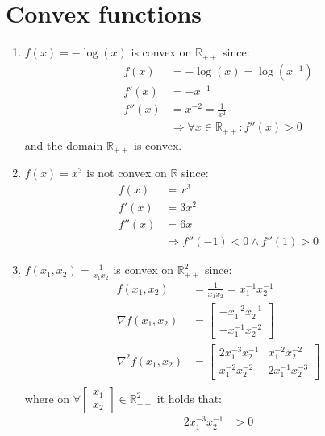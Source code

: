 \documentclass[oneside, a4paper]{book}
\begin{document}
\section{Convex functions}

\begin{enumerate}
    \item $f(x) = -\log(x)$ is convex on $\mathds{R}_{++}$ since:
    \begin{align*}
        f(x) &= -\log(x) = \log(x^{-1})\\
        f'(x) &= -x^{-1}\\
        f''(x) &= x^{-2} = \frac{1}{x^2} \\
        &\Longrightarrow \forall x\in\mathds{R}_{++}: f''(x) > 0
    \end{align*}
    and the domain $\mathds{R}_{++}$ is convex.
    \item $f(x) = x^3$ is not convex on $\mathds{R}$ since:
    \begin{align*}
        f(x) &= x^3\\
        f'(x) &= 3x^2\\
        f''(x) &= 6x \\
        &\Longrightarrow f''(-1) < 0 \land f''(1) > 0
    \end{align*}
    \item $f(x_1,x_2) = \frac{1}{x_1 x_2}$ is convex on $\mathds{R}^2_{++}$ since:
    \begin{align*}
        f(x_1,x_2) &= \frac{1}{x_1 x_2} = x_1^{-1} x_2^{-1}\\
        \nabla f(x_1,x_2) &= \begin{bmatrix}
            -x_1^{-2} x_2^{-1} \\
            -x_1^{-1} x_2^{-2}
        \end{bmatrix}\\
        \nabla^2 f(x_1,x_2) &= \begin{bmatrix}
            2x_1^{-3} x_2^{-1}      &  x_1^{-2} x_2^{-2}\\
             x_1^{-2} x_2^{-2}      &  2x_1^{-1} x_2^{-3}
        \end{bmatrix}\\
    \end{align*}
    where on $\forall \begin{bmatrix}
        x_1\\x_2
    \end{bmatrix}\in\mathds{R}^2_{++}$ it holds that: \begin{align*}
        2 x_1^{-3} x_2^{-1} &> 0\\

\end{align*}
\end{enumerate}
\end{document}
